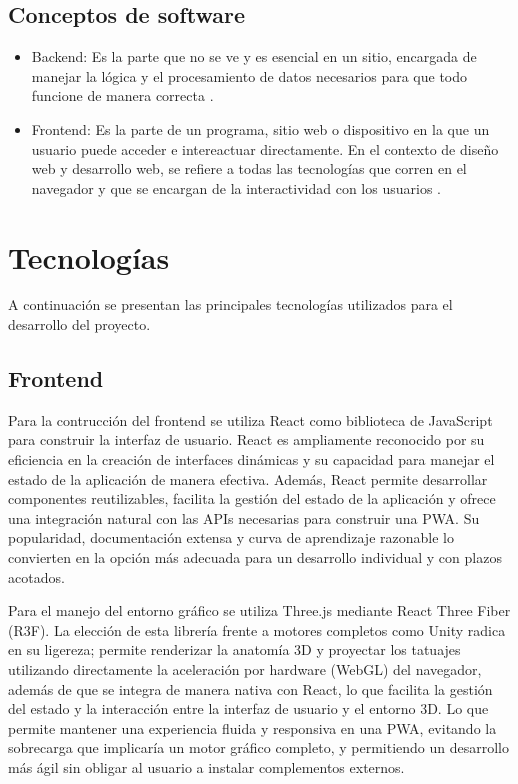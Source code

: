 \subsection{Conceptos de software }

\begin{itemize}
  \item Backend: Es la parte que no se ve y es esencial en un sitio, encargada de manejar la lógica y el procesamiento de datos necesarios para que todo funcione de manera correcta \cite{canaday1974}.

  \item Frontend: Es la parte de un programa, sitio web o dispositivo en la que un usuario puede acceder e intereactuar directamente. En el contexto de diseño web y desarrollo web, se refiere a todas las tecnologías que corren en el navegador y que se encargan de la interactividad con los usuarios \cite{perez2021}.
\end{itemize}

\section{Tecnologías }

A continuación se presentan las principales tecnologías utilizados para el desarrollo del proyecto.

\subsection{Frontend}

Para la contrucción del frontend se utiliza React\cite{react} como biblioteca de JavaScript\cite{javascript} para construir la interfaz de usuario. React es ampliamente reconocido por su eficiencia en la creación de interfaces dinámicas y su capacidad para manejar el estado de la aplicación de manera efectiva. Además, React permite desarrollar componentes reutilizables, facilita la gestión del estado de la aplicación y ofrece una integración natural con las APIs necesarias para construir una PWA. Su popularidad, documentación extensa y curva de aprendizaje razonable lo convierten en la opción más adecuada para un desarrollo individual y con plazos acotados.

Para el manejo del entorno gráfico se utiliza Three.js\cite{threejs} mediante React Three Fiber (R3F)\cite{r3f}. La elección de esta librería frente a motores completos como Unity\cite{unity} radica en su ligereza; permite renderizar la anatomía 3D y proyectar los tatuajes utilizando directamente la aceleración por hardware (WebGL)\cite{webgl} del navegador, además de que se integra de manera nativa con React, lo que facilita la gestión del estado y la interacción entre la interfaz de usuario y el entorno 3D. Lo que permite mantener una experiencia fluida y responsiva en una PWA, evitando la sobrecarga que implicaría un motor gráfico completo, y permitiendo un desarrollo más ágil sin obligar al usuario a instalar complementos externos.

